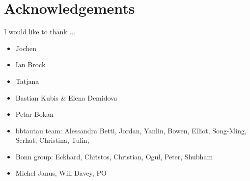 \chapter*{Acknowledgements}
\label{sec:ack}

I would like to thank ...

\begin{itemize}
\item Jochen
\item Ian Brock
\item Tatjana
\item Bastian Kubis \& Elena Demidova
\item Petar Bokan
\item bbtautau team: Alessandra Betti, Jordan, Yanlin, Bowen, Elliot, Song-Ming, Serhat, Christina, Tulin,
\item Bonn group: Eckhard, Christos, Christian, Ogul, Peter, Shubham
\item Michel Janus, Will Davey, PO
\end{itemize}

